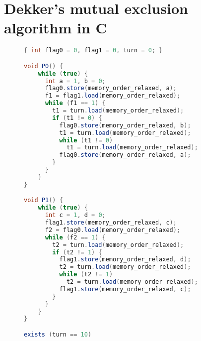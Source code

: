 \section{Dekker's mutual exclusion algorithm in C}
\label{apx:dekker}

\begin{figure}[H]
\begin{lstlisting}[language=Java,morekeywords={memory_order_relaxed}]
{ int flag0 = 0, flag1 = 0, turn = 0; }

void P0() {
    while (true) {
      int a = 1, b = 0;
      flag0.store(memory_order_relaxed, a);
      f1 = flag1.load(memory_order_relaxed);
      while (f1 == 1) {
        t1 = turn.load(memory_order_relaxed);
        if (t1 != 0) {
          flag0.store(memory_order_relaxed, b);
          t1 = turn.load(memory_order_relaxed);
          while (t1 != 0)
            t1 = turn.load(memory_order_relaxed);
          flag0.store(memory_order_relaxed, a);
        }
      }
    }
}

void P1() {
    while (true) {
      int c = 1, d = 0;
      flag1.store(memory_order_relaxed, c);
      f2 = flag0.load(memory_order_relaxed);
      while (f2 == 1) {
        t2 = turn.load(memory_order_relaxed);
        if (t2 != 1) {
          flag1.store(memory_order_relaxed, d);
          t2 = turn.load(memory_order_relaxed);
          while (t2 != 1)
            t2 = turn.load(memory_order_relaxed);
          flag1.store(memory_order_relaxed, c);
        }
      }
    }
}

exists (turn == 10)
\end{lstlisting}
\end{figure}
